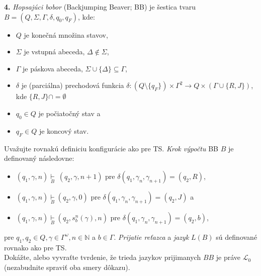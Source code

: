 \documentclass[11pt]{article}
\newcommand{\task}[2]{\par \noindent \textbf{{#1}.} \hspace{3pt} #2 \vspace{10pt}}
\begin{document}
\task{4}{
\textit{Hopsajúci bobor} (Backjumping Beaver; BB) je šestica tvaru $B = (Q, \Sigma, \Gamma, \delta, q_0, q_F)$, kde:
\begin{itemize}
\setlength\itemsep{0.1em}
\item $Q$ je konečná množina stavov,
\item $\Sigma$ je vstupná abeceda, $\Delta \notin \Sigma$,
\item $\Gamma$ je páskova abeceda, $\Sigma \cup \{\Delta\} \subseteq \Gamma$,
\item $\delta$ je (parciálna) prechodová funkcia $\delta : (Q \setminus \{q_F\}) \times \Gamma^2 \to Q \times (\Gamma \cup \{R, J\})$, kde $\{R,J\} \cap = \emptyset$
\item $q_0 \in Q$ je počiatočný stav a 
\item $q_F \in Q$ je koncový stav.
\end{itemize}

Uvažujte rovnakú definiciu konfigurácie ako pre TS. \textit{Krok výpočtu} BB $B$ je definovaný následovne:
\begin{itemize}
\item $(q_1, \gamma, n) \underset{B}\vdash\ (q_2, \gamma, n + 1)$ pre $\delta(q_1, \gamma_n, \gamma_{n+1}) = (q_2, R)$,
\item $(q_1, \gamma, n) \underset{B}\vdash (q_2, \gamma, 0)$ pre $\delta(q_1, \gamma_n, \gamma_{n+1}) = (q_2, J)$ a
\item $(q_1, \gamma, n) \underset{B}\vdash (q_2, s^n_b(\gamma), n)$ pre $\delta(q_1, \gamma_n, \gamma_{n+1}) = (q_2, b)$,
\end{itemize}
pre $q_1, q_2 \in Q, \gamma \in \Gamma^\omega, n \in \mathbb{N}$ a $b \in  \Gamma$. \textit{Prijatie reťazca} a \textit{jazyk} $L(B)$ sú definované rovnako ako pre TS. \\
Dokážte, alebo vyvraťte tvrdenie, že trieda jazykov prijimanych $BB$ je práve $\mathcal{L}_0$ (nezabudnite spraviť oba smery dôkazu).
}
\end{document}
